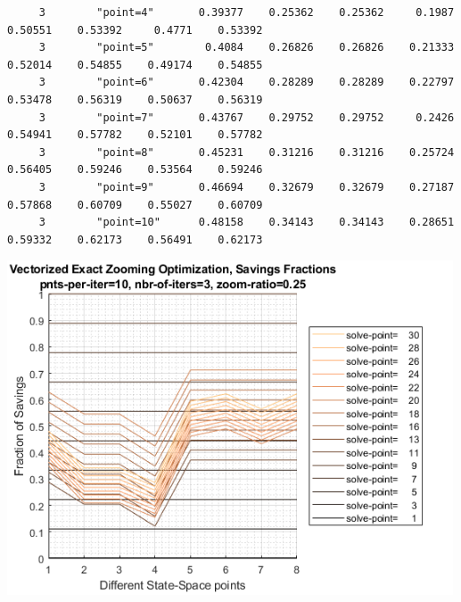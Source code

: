 \documentclass[
]{book}
\begin{document}
\begin{verbatim}
     3        "point=4"       0.39377    0.25362    0.25362     0.1987    0.50551    0.53392     0.4771    0.53392
     3        "point=5"        0.4084    0.26826    0.26826    0.21333    0.52014    0.54855    0.49174    0.54855
     3        "point=6"       0.42304    0.28289    0.28289    0.22797    0.53478    0.56319    0.50637    0.56319
     3        "point=7"       0.43767    0.29752    0.29752     0.2426    0.54941    0.57782    0.52101    0.57782
     3        "point=8"       0.45231    0.31216    0.31216    0.25724    0.56405    0.59246    0.53564    0.59246
     3        "point=9"       0.46694    0.32679    0.32679    0.27187    0.57868    0.60709    0.55027    0.60709
     3        "point=10"      0.48158    0.34143    0.34143    0.28651    0.59332    0.62173    0.56491    0.62173
\end{verbatim}

\includegraphics[width=5.20833in,height=\textheight]{img/fx_optim_mzoom_savezrone_images/figure_2.png}
\end{document}
